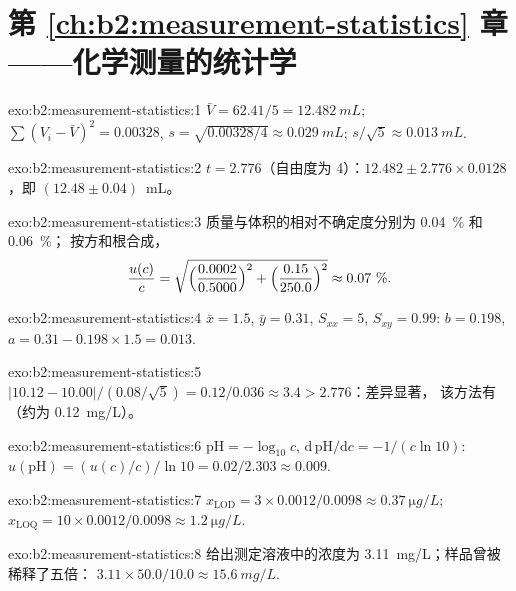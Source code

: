 \section*{第 \ref{ch:b2:measurement-statistics} 章——化学测量的统计学}

\begin{solution}{exo:b2:measurement-statistics:1}
$\bar V = 62.41/5 = \qty{12.482}{mL}$; $\sum(V_i - \bar V)^2 = 0.00328$, $s = \sqrt{0.00328/4} \approx
\qty{0.029}{mL}$; $s/\sqrt5 \approx \qty{0.013}{mL}$.
\end{solution}

\begin{solution}{exo:b2:measurement-statistics:2}
$t = 2.776$（自由度为 4）：$12.482 \pm 2.776 \times 0.0128$，即 $(12.48 \pm 0.04)$~mL。
\end{solution}

\begin{solution}{exo:b2:measurement-statistics:3}
质量与体积的相对不确定度分别为 0.04~\% 和 0.06~\%；
按方和根合成，
\[\frac{u(c)}{c} = \sqrt{\Bigl(\frac{0.0002}{0.5000}\Bigr)^2 + \Bigl(\frac{0.15}{250.0}\Bigr)^2}
\approx 0.07~\%.\]
\end{solution}

\begin{solution}{exo:b2:measurement-statistics:4}
$\bar x = 1.5$, $\bar y = 0.31$, $S_{xx} = 5$, $S_{xy} = 0.99$: $b = 0.198$, $a = 0.31 - 0.198 \times 1.5
= 0.013$.
\end{solution}

\begin{solution}{exo:b2:measurement-statistics:5}
$|10.12 - 10.00|/(0.08/\sqrt5) = 0.12/0.036 \approx 3.4 > 2.776$：差异显著，
该方法有（约为 \qty{+0.12}{mg/L}）。
\end{solution}

\begin{solution}{exo:b2:measurement-statistics:6}
$\mathrm{pH} = -\log_{10}c$, $\mathrm d\,\mathrm{pH}/\mathrm dc = -1/(c\ln10)$:
$u(\mathrm{pH}) = (u(c)/c)/\ln10 = 0.02/2.303 \approx 0.009$.
\end{solution}

\begin{solution}{exo:b2:measurement-statistics:7}
$x_{\mathrm{LOD}} = 3 \times 0.0012/0.0098 \approx \qty{0.37}{\micro g/L}$; $x_{\mathrm{LOQ}} = 10
\times 0.0012/0.0098 \approx \qty{1.2}{\micro g/L}$.
\end{solution}

\begin{solution}{exo:b2:measurement-statistics:8}
给出测定溶液中的浓度为 \qty{3.11}{mg/L}；样品曾被稀释了五倍：
$3.11 \times 50.0/10.0 \approx \qty{15.6}{mg/L}$.
\end{solution}


